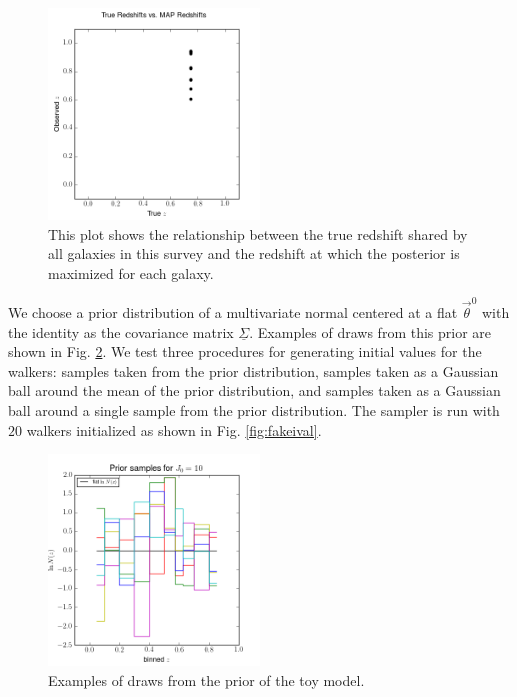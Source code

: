 \documentclass[preprint]{aastex}
\newcommand{\textul}{\underline}
\begin{document}
\begin{figure}
\includegraphics[width=0.5\textwidth]{toy/truevmap.png}
\caption{This plot shows the relationship between the true redshift shared by all galaxies in this survey and the redshift at which the posterior is maximized for each galaxy.}
\label{fig:toycat}
\end{figure}

We choose a prior distribution of a multivariate normal centered at a flat $\vec{\theta}^{0}$ with the identity as the covariance matrix $\textul{\Sigma}$.  Examples of draws from this prior are shown in Fig. \ref{fig:fakeprior}.  We test three procedures for generating initial values for the walkers: samples taken from the prior distribution, samples taken as a Gaussian ball around the mean of the prior distribution, and samples taken as a Gaussian ball around a single sample from the prior distribution.  The sampler is run with $20$ walkers initialized as shown in Fig. \ref{fig:fakeival}.

\begin{figure}
\includegraphics[width=0.5\textwidth]{toy/priorsamps.png}
\caption{Examples of draws from the prior of the toy model.}
\label{fig:fakeprior}
\end{figure}
\end{document}
